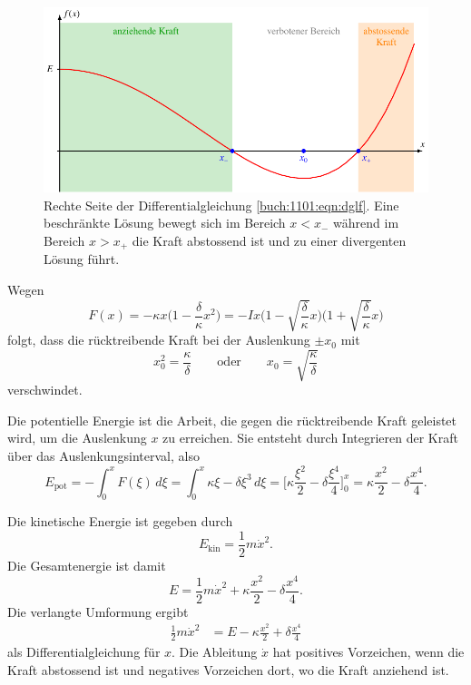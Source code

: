 \begin{loesung}
\begin{figure}
\centering
\includegraphics{chapters/110-elliptisch/uebungsaufgaben/anharmonisch.pdf}
\caption{Rechte Seite der Differentialgleichung
\eqref{buch:1101:eqn:dglf}. 
Eine beschränkte Lösung bewegt sich im Bereich $x<x_-$
während im Bereich $x>x_+$ die Kraft abstossend ist und zu einer
divergenten Lösung führt.
\label{buch:1101:fig:potential}
}
\end{figure}
\begin{teilaufgaben}
\item
Wegen
\[
F(x)
=
-\kappa x\biggl(1-\frac{\delta}{\kappa}x^2\biggr)
=
-Ix
\biggl(1-\sqrt{\frac{\delta}{\kappa}}x\biggr)
\biggl(1+\sqrt{\frac{\delta}{\kappa}}x\biggr)
\]
folgt, dass die rücktreibende Kraft bei der Auslenkung  $\pm x_0$ mit
\[
x_0^2
=
\frac{\kappa}{\delta}
\qquad\text{oder}\qquad
x_0 = \sqrt{\frac{\kappa}{\delta}}
\]
verschwindet.
\item
Die potentielle Energie ist die Arbeit, die gegen die rücktreibende Kraft
geleistet wird, um die Auslenkung $x$ zu erreichen.
Sie entsteht durch Integrieren der Kraft über
das Auslenkungsinterval, also
\[
E_{\text{pot}}
=
-
\int_0^x F(\xi) \,d\xi
=
\int_0^x \kappa\xi-\delta\xi^3\,d\xi
=
\biggl[
\kappa\frac{\xi^2}{2}
-
\delta
\frac{\xi^4}{4}
\biggr]_0^x
=
\kappa\frac{x^2}{2}
-
\delta\frac{x^4}{4}.
\]
\item
Die kinetische Energie ist gegeben durch
\[
E_{\text{kin}}
=
\frac12m\dot{x}^2.
\]
Die Gesamtenergie ist damit
\[
E
=
\frac12m\dot{x}^2
+
\kappa
\frac{x^2}{2}
-
\delta
\frac{x^4}{4}.
\]
Die verlangte Umformung ergibt
\begin{align}
\frac12m\dot{x}^2
&=
E
-
\kappa\frac{x^2}{2}
+
\delta\frac{x^4}{4}
\label{buch:1101:eqn:dglf}
\end{align}
als Differentialgleichung für $x$.
Die Ableitung $\dot{x}$ hat positives Vorzeichen, wenn die Kraft
abstossend ist und negatives Vorzeichen dort, wo die Kraft anziehend ist.

\end{teilaufgaben}
\end{loesung}
